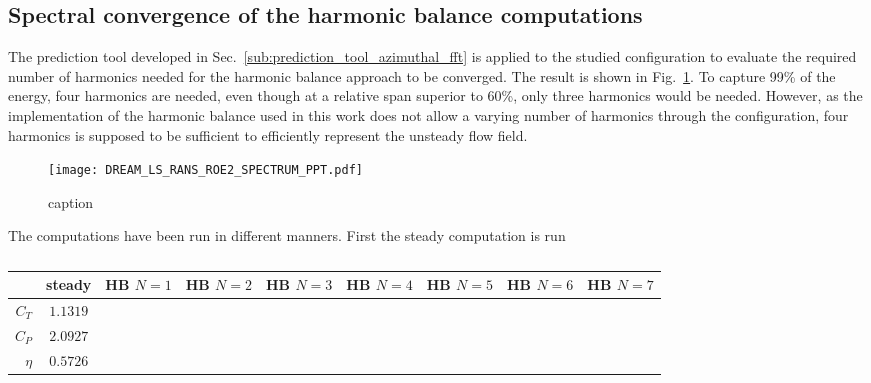 
\subsection{Spectral convergence of the harmonic balance computations} 
\label{sub:dream_ls_hb_convergence}

The prediction tool developed in 
Sec.~\ref{sub:prediction_tool_azimuthal_fft} is applied
to the studied configuration to evaluate the
required number of harmonics needed for the
harmonic balance approach to be converged.
The result is shown in Fig.~\ref{fig:DREAM_LS_RANS_ROE2_SPECTRUM_PPT}.
To capture 99\% of the energy, four harmonics are needed, even though
at a relative span superior to 60\%, only three harmonics would be needed.
However, as the implementation of the harmonic balance used
in this work does not allow a varying number of harmonics through the
configuration, four harmonics is supposed to be sufficient to efficiently 
represent the unsteady flow field.
\begin{figure}[htb]
  \centering
  \texttt{[image: DREAM\_LS\_RANS\_ROE2\_SPECTRUM\_PPT.pdf]}
  \caption{caption}
  \label{fig:DREAM_LS_RANS_ROE2_SPECTRUM_PPT}
\end{figure}

The computations have been run in different manners. First the steady computation
is run
\begin{table}[htb]
   \centering
  \begin{tabular}{rcccccccc}
    \toprule
    & steady & HB $N=1$ & HB $N=2$ & HB $N=3$ & HB $N=4$ & HB $N=5$ & HB $N=6$ & HB $N=7$\\
    \midrule
    $C_T$  & $1.1319$ &  \\
    $C_P$  & $2.0927$ &  \\
    $\eta$ & $0.5726$ &  \\
    \bottomrule
  \end{tabular}
  \caption{}
  \label{tab:}
\end{table}



